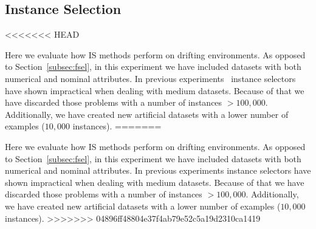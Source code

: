 \documentclass[preprint,12pt]{elsarticle}
\begin{document}
\begin{itemize}



\subsection{\textbf{Instance Selection}}
<<<<<<< HEAD
\label{subsec:exp-isel}

Here we evaluate how IS methods perform on drifting environments. As opposed to Section~\ref{subsec:fsel}, in this experiment we have included datasets with both numerical and nominal attributes. In previous experiments~\cite{lu16} instance selectors have shown impractical when dealing with medium datasets. Because of that we have discarded those problems with a number of instances $> 100,000$. Additionally, we have created new artificial datasets with a lower number of examples ($10,000$ instances). 
=======
\label{subsec:isel}

Here we evaluate how IS methods perform on drifting environments. As opposed to Section~\ref{subsec:fsel}, in this experiment we have included datasets with both numerical and nominal attributes. In previous experiments instance selectors have shown impractical when dealing with medium datasets. Because of that we have discarded those problems with a number of instances $> 100,000$. Additionally, we have created new artificial datasets with a lower number of examples ($10,000$ instances). 
>>>>>>> 04896ff48804e37f4ab79e52c5a19d2310ca1419


\end{itemize}
\end{document}
